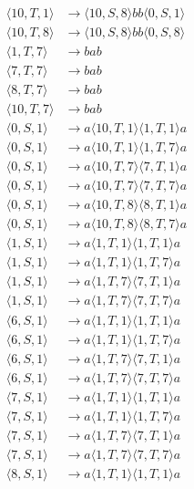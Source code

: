 \documentclass[12pt,a4paper]{article}
\begin{document}
\[
\begin{aligned}
\langle10,T,1\rangle&\to \langle10,S,8\rangle bb\langle0,S,1\rangle\\
\langle10,T,8\rangle&\to \langle10,S,8\rangle bb\langle0,S,8\rangle\\
\langle1,T,7\rangle&\to bab\\
\langle7,T,7\rangle&\to bab\\
\langle8,T,7\rangle&\to bab\\
\langle10,T,7\rangle&\to bab\\
\langle0,S,1\rangle&\to a\langle10,T,1\rangle\langle1,T,1\rangle a\\
\langle0,S,1\rangle&\to a\langle10,T,1\rangle\langle1,T,7\rangle a\\
\langle0,S,1\rangle&\to a\langle10,T,7\rangle\langle7,T,1\rangle a\\
\langle0,S,1\rangle&\to a\langle10,T,7\rangle\langle7,T,7\rangle a\\
\langle0,S,1\rangle&\to a\langle10,T,8\rangle\langle8,T,1\rangle a\\
\langle0,S,1\rangle&\to a\langle10,T,8\rangle\langle8,T,7\rangle a\\
\langle1,S,1\rangle&\to a\langle1,T,1\rangle\langle1,T,1\rangle a\\
\langle1,S,1\rangle&\to a\langle1,T,1\rangle\langle1,T,7\rangle a\\
\langle1,S,1\rangle&\to a\langle1,T,7\rangle\langle7,T,1\rangle a\\
\langle1,S,1\rangle&\to a\langle1,T,7\rangle\langle7,T,7\rangle a\\
\langle6,S,1\rangle&\to a\langle1,T,1\rangle\langle1,T,1\rangle a\\
\langle6,S,1\rangle&\to a\langle1,T,1\rangle\langle1,T,7\rangle a\\
\langle6,S,1\rangle&\to a\langle1,T,7\rangle\langle7,T,1\rangle a\\
\langle6,S,1\rangle&\to a\langle1,T,7\rangle\langle7,T,7\rangle a\\
\langle7,S,1\rangle&\to a\langle1,T,1\rangle\langle1,T,1\rangle a\\
\langle7,S,1\rangle&\to a\langle1,T,1\rangle\langle1,T,7\rangle a\\
\langle7,S,1\rangle&\to a\langle1,T,7\rangle\langle7,T,1\rangle a\\
\langle7,S,1\rangle&\to a\langle1,T,7\rangle\langle7,T,7\rangle a\\
\langle8,S,1\rangle&\to a\langle1,T,1\rangle\langle1,T,1\rangle a\\

\end{aligned}\]
\end{document}
